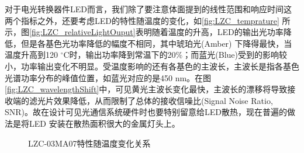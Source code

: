 对于电光转换器件LED而言，我们除了要注意体面提到的线性范围和响应时间这两个指标之外，还要考虑LED的特性随温度的变化，如\autoref{fig:LZC_temprature} 所示\cite{LZC2013}，图\ref{fig:LZC_relativeLightOuput}表明随着温度的升高，LED的输出光功率降低，但是各基色光功率降低的幅度不相同，其中琥珀光(Amber) 下降得最快，当温度升高到120 $^{\circ}$C时，输出功率降到常温下的20\%；而蓝光(Blue)受到的影响较小，功率输出变化不明显。受温度影响的还有各基色的主波长，主波长是指各基色光谱功率分布的峰值位置，如蓝光对应的是450 nm。在图\ref{fig:LZC_wavelengthShift}中，可见黄光主波长变化最快，主波长的漂移将导致接收端的滤光片效果降低，从而限制了总体的接收信噪比(Signal Noise Ratio, SNR)。故在设计可见光通信系统硬件时也要特别留意给LED散热，现在普遍的做法是将LED 安装在散热面积很大的金属灯头上。
\begin{figure}[h]
    \centering
    \caption{LZC-03MA07特性随温度变化关系}
    \label{fig:LZC_temprature}
\end{figure}

